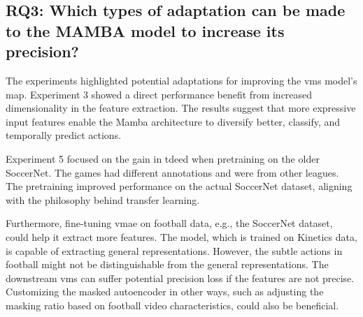 \subsection{RQ3: Which types of adaptation can be made to the MAMBA model to increase its precision?}



The experiments highlighted potential adaptations for improving the \acrshort{vms} model's \acrshort{map}. Experiment 3 showed a direct performance benefit from increased dimensionality in the feature extraction. The results suggest that more expressive input features enable the Mamba architecture to diversify better, classify, and temporally predict actions. 

Experiment 5 focused on the gain in \acrshort{tdeed} when pretraining on the older SoccerNet. The games had different annotations and were from other leagues. The pretraining improved performance on the actual SoccerNet dataset, aligning with the philosophy behind transfer learning. 

Furthermore, fine-tuning \acrshort{vmae} on football data, e.g., the SoccerNet dataset, could help it extract more features. The model, which is trained on Kinetics data, is capable of extracting general representations. However, the subtle actions in football might not be distinguishable from the general representations. The downstream \acrshort{vms} can suffer potential precision loss if the features are not precise. Customizing the masked autoencoder in other ways, such as adjusting the masking ratio based on football video characteristics, could also be beneficial. 

